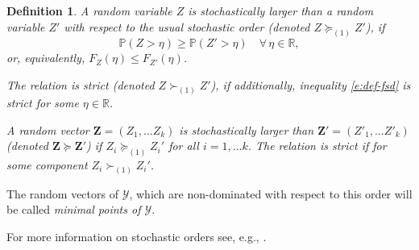 \documentclass[10pt,letterpaper]{article}
\newcommand{\R}{\mathbb{R}}
\newcommand{\Yc}{\mathcal{Y}}
\newcommand{\1}{1{\hskip -2.55 pt}\hbox{I}}
\newcommand{\fsd}{\succeq_{(1)}}
\newcommand{\sfsd}{\succ_{(1)}}
\newtheorem{definition}[theorem]{Definition}
\begin{document}
\begin{definition}
\label{d:order}
A random variable $Z$ is stochastically larger than a random variable $Z'$ with respect to the usual stochastic order (denoted $Z\fsd Z'$), if
\begin{equation}
\label{e:def-fsd}
\mathbb P  (Z >\eta)\geq \mathbb P  (Z' >\eta)\quad \forall\, \eta\in\R,
\end{equation}
or, equivalently, $F_{Z}(\eta)\leq F_{Z'}(\eta)$.  

The relation is strict (denoted $Z\sfsd Z'$), if additionally, inequality \eqref{e:def-fsd} is strict for some $ \eta\in\R$.

A random vector $\mathbf{Z}= (Z_1,\dots Z_k)$ is stochastically larger than $\mathbf{Z}'= (Z'_1,\dots Z'_k)$
(denoted $\mathbf{Z} \succeq \mathbf{Z}'$) if
$Z_i\fsd Z_i'$ for all $i=1,\dots k$. The relation is strict if for some component $Z_i\sfsd Z_i'$.
\end{definition}
The random vectors of $\Yc$, which are non-dominated with respect to this order will be called \emph{minimal points of $\Yc$}.

For more information on stochastic orders see, e.g., \cite{shaked2007stochastic}.
\end{document}
